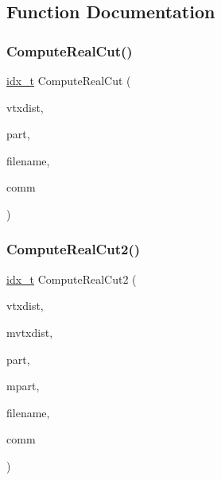 \subsection{Function Documentation}
\mbox{\label{a00428_a725d56a999dc467b3f7883eea465bab2}} 
\subsubsection{\texorpdfstring{Compute\+Real\+Cut()}{ComputeRealCut()}}
{\footnotesize\ttfamily \hyperlink{a00876_aaa5262be3e700770163401acb0150f52}{idx\+\_\+t} Compute\+Real\+Cut (\begin{DoxyParamCaption}\item[{\hyperlink{a00876_aaa5262be3e700770163401acb0150f52}{idx\+\_\+t} $\ast$}]{vtxdist,  }\item[{\hyperlink{a00876_aaa5262be3e700770163401acb0150f52}{idx\+\_\+t} $\ast$}]{part,  }\item[{char $\ast$}]{filename,  }\item[{M\+P\+I\+\_\+\+Comm}]{comm }\end{DoxyParamCaption})}

\mbox{\label{a00428_a5bf6f2fe30133c3be1dc3d34329e650d}} 
\subsubsection{\texorpdfstring{Compute\+Real\+Cut2()}{ComputeRealCut2()}}
{\footnotesize\ttfamily \hyperlink{a00876_aaa5262be3e700770163401acb0150f52}{idx\+\_\+t} Compute\+Real\+Cut2 (\begin{DoxyParamCaption}\item[{\hyperlink{a00876_aaa5262be3e700770163401acb0150f52}{idx\+\_\+t} $\ast$}]{vtxdist,  }\item[{\hyperlink{a00876_aaa5262be3e700770163401acb0150f52}{idx\+\_\+t} $\ast$}]{mvtxdist,  }\item[{\hyperlink{a00876_aaa5262be3e700770163401acb0150f52}{idx\+\_\+t} $\ast$}]{part,  }\item[{\hyperlink{a00876_aaa5262be3e700770163401acb0150f52}{idx\+\_\+t} $\ast$}]{mpart,  }\item[{char $\ast$}]{filename,  }\item[{M\+P\+I\+\_\+\+Comm}]{comm }\end{DoxyParamCaption})}

